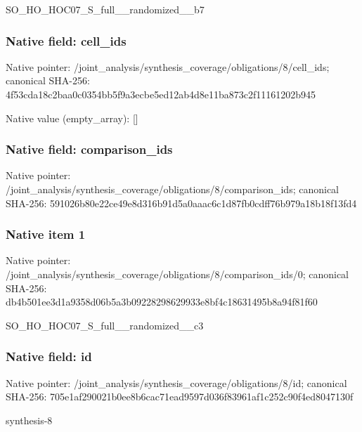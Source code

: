 \documentclass[10pt,a4paper]{article}
\begin{document}
\begingroup\raggedright\sloppy SO\_\allowbreak{}HO\_\allowbreak{}HOC07\_\allowbreak{}S\_\allowbreak{}full\_\allowbreak{}\_\allowbreak{}randomized\_\allowbreak{}\_\allowbreak{}b7\par\endgroup

\subsubsection{Native field: cell\_\allowbreak{}ids}
Native pointer: /joint\_\allowbreak{}analysis/synthesis\_\allowbreak{}coverage/obligations/8/cell\_\allowbreak{}ids; canonical SHA-256: 4f53cda18c2baa0c0354bb5f9a3ecbe5ed12ab4d8e11ba873c2f11161202b945

Native value (empty\_\allowbreak{}array): []

\subsubsection{Native field: comparison\_\allowbreak{}ids}
Native pointer: /joint\_\allowbreak{}analysis/synthesis\_\allowbreak{}coverage/obligations/8/comparison\_\allowbreak{}ids; canonical SHA-256: 591026b80e22ce49e8d316b91d5a0aaac6c1d87fb0cdff76b979a18b18f13fd4

\subsubsection{Native item 1}
Native pointer: /joint\_\allowbreak{}analysis/synthesis\_\allowbreak{}coverage/obligations/8/comparison\_\allowbreak{}ids/0; canonical SHA-256: db4b501ee3d1a9358d06b5a3b09228298629933e8bf4c18631495b8a94f81f60

\begingroup\raggedright\sloppy SO\_\allowbreak{}HO\_\allowbreak{}HOC07\_\allowbreak{}S\_\allowbreak{}full\_\allowbreak{}\_\allowbreak{}randomized\_\allowbreak{}\_\allowbreak{}c3\par\endgroup

\subsubsection{Native field: id}
Native pointer: /joint\_\allowbreak{}analysis/synthesis\_\allowbreak{}coverage/obligations/8/id; canonical SHA-256: 705e1af290021b0ee8b6cac71ead9597d036f83961af1c252c90f4ed8047130f

\begingroup\raggedright\sloppy synthesis-8\par\endgroup
\end{document}
